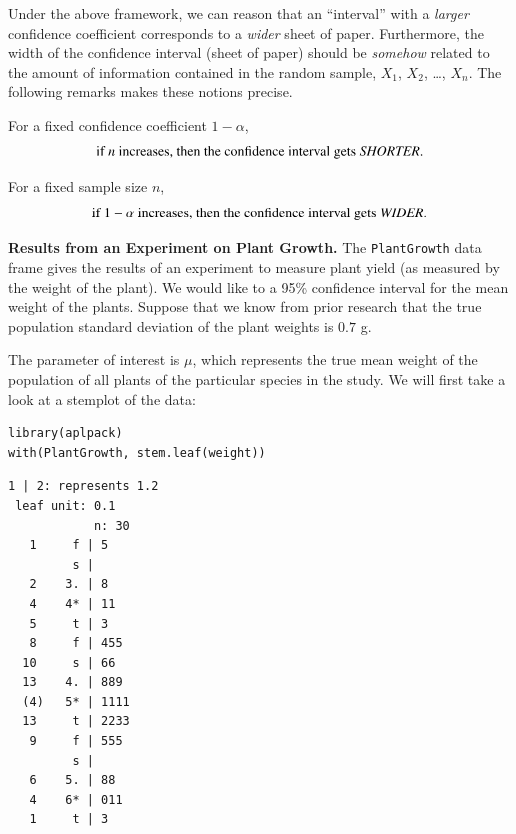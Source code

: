 \documentclass[captions=tableheading]{scrbook}
\begin{document}
Under the above framework, we can reason that an ``interval'' with a \emph{larger} confidence coefficient corresponds to a \emph{wider} sheet of paper. Furthermore, the width of the confidence interval (sheet of paper) should be \emph{somehow} related to the amount of information contained in the random sample, \(X_{1}\), \(X_{2}\), \ldots{},
\(X_{n}\). The following remarks makes these notions precise. 

\begin{rem}
For a fixed confidence coefficient \(1-\alpha\),
\begin{equation}
\mbox{if }n\mbox{ increases, then the confidence interval gets \emph{SHORTER}.}
\end{equation}
\end{rem}

\begin{rem}
For a fixed sample size \(n\),
\begin{equation}
\mbox{if }1-\alpha\mbox{ increases, then the confidence interval gets \emph{WIDER}.}
\end{equation}
\end{rem}


\begin{example}
\textbf{Results from an Experiment on Plant Growth.} The \texttt{PlantGrowth} data frame gives the results of an experiment to measure plant yield (as measured by the weight of the plant). We would like to a 95\% confidence interval for the mean weight of the plants. Suppose that we know from prior research that the true population standard deviation of the plant weights is \(0.7\) g.

The parameter of interest is \(\mu\), which represents the true mean weight of the population of all plants of the particular species in the study. We will first take a look at a stemplot of the data:

\end{example}


\begin{verbatim}
library(aplpack)
with(PlantGrowth, stem.leaf(weight))
\end{verbatim}


\begin{verbatim}
1 | 2: represents 1.2
 leaf unit: 0.1
            n: 30
   1     f | 5
         s | 
   2    3. | 8
   4    4* | 11
   5     t | 3
   8     f | 455
  10     s | 66
  13    4. | 889
  (4)   5* | 1111
  13     t | 2233
   9     f | 555
         s | 
   6    5. | 88
   4    6* | 011
   1     t | 3
\end{verbatim}
\end{document}
